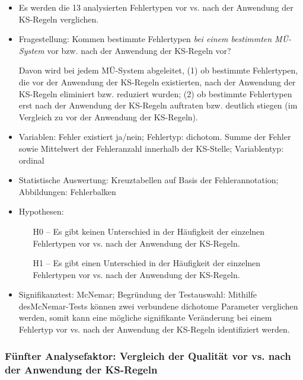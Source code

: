 \begin{itemize}
\item Es werden die 13 analysierten Fehlertypen vor vs. nach der Anwendung der KS-Regeln verglichen.

\item Fragestellung: Kommen bestimmte Fehlertypen \textit{bei einem bestimmten MÜ-System} vor bzw. nach der Anwendung der KS-Regeln vor?

Davon wird bei jedem MÜ-System abgeleitet, (1) ob bestimmte Fehlertypen, die vor der Anwendung der KS-Regeln existierten, nach der Anwendung der KS-Regeln eliminiert bzw. reduziert wurden; (2) ob bestimmte Fehlertypen erst nach der Anwendung der KS-Regeln auftraten bzw. deutlich stiegen (im Vergleich zu vor der Anwendung der KS-Regeln).

\item Variablen: Fehler existiert ja/nein; Fehlertyp: dichotom. Summe der Fehler sowie Mittelwert der Fehleranzahl innerhalb der KS-Stelle; Variablentyp: ordinal

\item Statistische Auswertung: Kreuztabellen auf Basis der Fehlerannotation; Abbildungen: Fehlerbalken

\item Hypothesen:

\begin{itemize}

\item[H0 --] Es gibt keinen Unterschied in der Häufigkeit der einzelnen Fehlertypen vor vs. nach der Anwendung der KS-Regeln.

\item[H1 --] Es gibt einen Unterschied in der Häufigkeit der einzelnen Fehlertypen vor vs. nach der Anwendung der KS-Regeln.

\end{itemize}
\item Signifikanztest: McNemar; Begründung der Testauswahl: Mithilfe des\linebreak McNe\-mar-Tests können zwei verbundene dichotome Parameter verglichen werden, somit kann eine mögliche signifikante Veränderung bei einem Fehlertyp vor vs. nach der Anwendung der KS-Regeln identifiziert werden.

\end{itemize}

\subsubsection*{Fünfter Analysefaktor: Vergleich der Qualität vor vs. nach der Anwendung der KS-Regeln}

